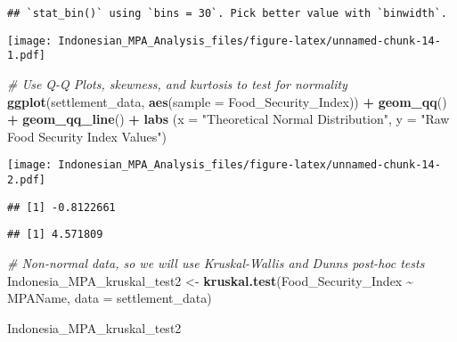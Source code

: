 \documentclass[
]{article}
\newenvironment{Shaded}{\begin{snugshade}}{\end{snugshade}}
\newcommand{\AttributeTok}[1]{\textcolor[rgb]{0.13,0.29,0.53}{#1}}
\newcommand{\CommentTok}[1]{\textcolor[rgb]{0.56,0.35,0.01}{\textit{#1}}}
\newcommand{\FunctionTok}[1]{\textcolor[rgb]{0.13,0.29,0.53}{\textbf{#1}}}
\newcommand{\NormalTok}[1]{#1}
\newcommand{\OtherTok}[1]{\textcolor[rgb]{0.56,0.35,0.01}{#1}}
\newcommand{\SpecialCharTok}[1]{\textcolor[rgb]{0.81,0.36,0.00}{\textbf{#1}}}
\newcommand{\StringTok}[1]{\textcolor[rgb]{0.31,0.60,0.02}{#1}}
\begin{document}
\begin{verbatim}
## `stat_bin()` using `bins = 30`. Pick better value with `binwidth`.
\end{verbatim}

\texttt{[image: Indonesian\_MPA\_Analysis\_files/figure-latex/unnamed-chunk-14-1.pdf]}

\begin{Shaded}
\begin{Highlighting}[]
\CommentTok{\# Use Q{-}Q Plots, skewness, and kurtosis to test for normality}
\FunctionTok{ggplot}\NormalTok{(settlement\_data, }\FunctionTok{aes}\NormalTok{(}\AttributeTok{sample =}\NormalTok{ Food\_Security\_Index)) }\SpecialCharTok{+}
  \FunctionTok{geom\_qq}\NormalTok{() }\SpecialCharTok{+}
  \FunctionTok{geom\_qq\_line}\NormalTok{() }\SpecialCharTok{+}
  \FunctionTok{labs}\NormalTok{ (}\AttributeTok{x =} \StringTok{"Theoretical Normal Distribution"}\NormalTok{,}
        \AttributeTok{y =} \StringTok{"Raw Food Security Index Values"}\NormalTok{)}
\end{Highlighting}
\end{Shaded}

\texttt{[image: Indonesian\_MPA\_Analysis\_files/figure-latex/unnamed-chunk-14-2.pdf]}

\begin{Shaded}
\end{Shaded}

\begin{verbatim}
## [1] -0.8122661
\end{verbatim}

\begin{Shaded}
\end{Shaded}

\begin{verbatim}
## [1] 4.571809
\end{verbatim}

\begin{Shaded}
\begin{Highlighting}[]
\CommentTok{\# Non{-}normal data, so we will use Kruskal{-}Wallis and Dunn\textquotesingle{}s post{-}hoc tests}
\NormalTok{Indonesia\_MPA\_kruskal\_test2 }\OtherTok{\textless{}{-}} \FunctionTok{kruskal.test}\NormalTok{(Food\_Security\_Index }\SpecialCharTok{\textasciitilde{}}\NormalTok{ MPAName, }
                                                  \AttributeTok{data =}\NormalTok{ settlement\_data)}

\NormalTok{Indonesia\_MPA\_kruskal\_test2}
\end{Highlighting}
\end{Shaded}
\end{document}
